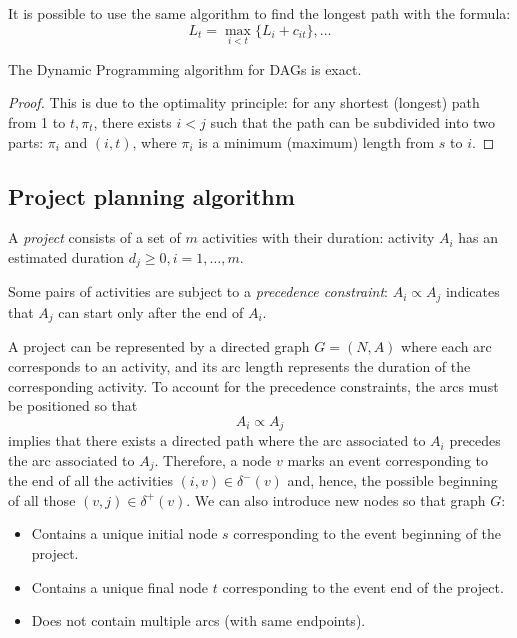 \documentclass[12pt, a4paper]{report}
\newtheorem[style=M,bodystyle=\normalfont]{proposition}{Proposition}
\newtheorem[style=M,bodystyle=\normalfont]{theorem}{Theorem}
\newtheorem[style=M,bodystyle=\normalfont]{corollary}{Corollary}
\newtheorem[style=M,bodystyle=\normalfont]{lemma}{Lemma}
\newtheorem[style=M,bodystyle=\normalfont]{definition}{Definition}
\begin{document}
    It is possible to use the same algorithm to find the longest path with the formula: 
    \[L_t=\max_{i<t}\{L_i+c_{it}\},\dots\]

    \begin{example}[Proposition]
        The Dynamic Programming algorithm for DAGs is exact. 
    \end{example}
    \begin{proof}
        This is due to the optimality principle: for any shortest (longest) path from 1 to $t,\pi_t$, there exists $i < j$ such that the path can be subdivided into two parts: 
        $\pi_i$ and $(i,t)$, where $\pi_i$ is a minimum (maximum) length from $s$ to $i$. 
    \end{proof}

    \subsection{Project planning algorithm}
    \begin{definition}
        A \emph{project} consists of a set of $m$ activities with their duration: activity $A_i$ has an estimated duration $d_j \geq 0, i=1,\dots,m$. 

        Some pairs of activities are subject to a \emph{precedence constraint}: $A_i \varpropto A_j$  indicates that $A_j$ can start only after the end of $A_i$. 
    \end{definition}
    A project can be represented by a directed graph $G = (N, A)$ where each arc corresponds to an activity, and its arc length represents the duration of the corresponding 
    activity. To account for the precedence constraints, the arcs must be positioned so that 
    \[A_i \varpropto A_j\]
    implies that there exists a directed path where the arc associated to $A_i$ precedes the arc associated to $A_j$. Therefore, a node $v$ marks an event corresponding to the end of 
    all the activities $(i,v) \in \delta^{-}(v)$ and, hence, the possible beginning of all those $(v,j) \in \delta^{+}(v)$. 
    We can also introduce new nodes so that graph $G$: 
    \begin{itemize}
        \item Contains a unique initial node $s$ corresponding to the event beginning of the project.
        \item Contains a unique final node $t$ corresponding to the event end of the project. 
        \item Does not contain multiple arcs (with same endpoints). 
    \end{itemize}
\end{document}
